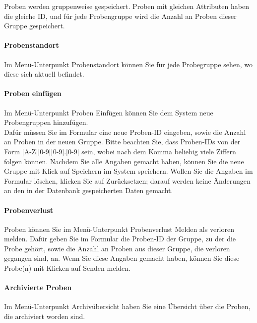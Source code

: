 \documentclass[enabledeprecatedfontcommands,fontsize=12pt,paper=a4,twoside]{scrartcl}
\begin{document}
Proben werden gruppenweise gespeichert. Proben mit gleichen Attributen haben die gleiche ID, und für jede Probengruppe wird die Anzahl an Proben dieser Gruppe gespeichert. \\

\paragraph{Probenstandort}
Im Menü-Unterpunkt Probenstandort können Sie für jede Probegruppe sehen, wo diese sich aktuell befindet. \\

\paragraph{Proben einfügen}
Im Menü-Unterpunkt Proben Einfügen können Sie dem System neue Probengruppen hinzufügen. \\

Dafür müssen Sie im Formular eine neue Proben-ID eingeben, sowie die Anzahl an Proben in der neuen Gruppe. Bitte beachten Sie, dass Proben-IDs von der Form [A-Z][0-9][0-9].[0-9] sein, wobei nach dem Komma beliebig viele Ziffern folgen können. Nachdem Sie alle Angaben gemacht haben, können Sie die neue Gruppe mit Klick auf Speichern im System speichern. Wollen Sie die Angaben im Formular löschen, klicken Sie auf Zurücksetzen; darauf werden keine Änderungen an den in der Datenbank gespeicherten Daten gemacht. \\
\paragraph{Probenverlust}
Proben können Sie im Menü-Unterpunkt Probenverlust Melden als verloren melden. Dafür geben Sie im Formular die Proben-ID der Gruppe, zu der die Probe gehört, sowie die Anzahl an Proben aus dieser Gruppe, die verloren gegangen sind, an. Wenn Sie diese Angaben gemacht haben, können Sie diese Probe(n) mit Klicken auf Senden melden. \\

\paragraph{Archivierte Proben}
Im Menü-Unterpunkt Archivübersicht haben Sie eine Übersicht über die Proben, die archiviert worden sind. \\
\end{document}
